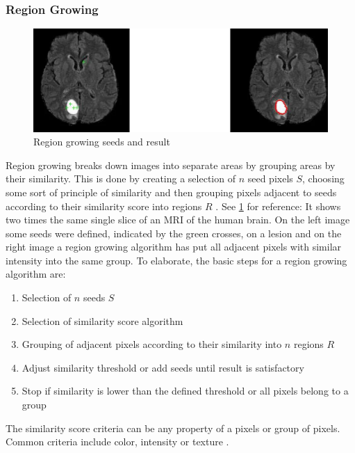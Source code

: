 \subsubsection{Region Growing}
\begin{figure}[h]
	\centerline{\includegraphics[scale=0.5]{images/regionGrowing.png}}
	\caption{Region growing seeds and result \cite{pandyaExploringImageSegmentation2024}}\label{fig:rgSR}
\end{figure}
\noindent
Region growing breaks down images into separate areas by grouping areas by their similarity.
This is done by creating a selection of $n$ seed pixels $S$, choosing some sort of principle of similarity
and then grouping pixels adjacent to seeds according to their similarity score into regions $R$ \cite{jourlinVariousContrastConcepts2016,palReviewImageSegmentation1993}.
See \cref{fig:rgSR} for reference: It shows two times the same single slice of an MRI of the human brain.
On the left image some seeds were defined, indicated by the green crosses, on a lesion
and on the right image a region growing algorithm has put all adjacent pixels with similar intensity into the same group.
To elaborate, the basic steps for a region growing algorithm are:
\begin{enumerate}
	\item Selection of $n$ seeds $S$
	\item Selection of similarity score algorithm
	\item Grouping of adjacent pixels according to their similarity into $n$ regions $R$
	\item Adjust similarity threshold or add seeds until result is satisfactory
	\item Stop if similarity is lower than the defined threshold or all pixels belong to a group
\end{enumerate}
\noindent
The similarity score criteria can be any property of a pixels or group of pixels.
Common criteria include color, intensity or texture \cite{jourlinVariousContrastConcepts2016,palReviewImageSegmentation1993}.
